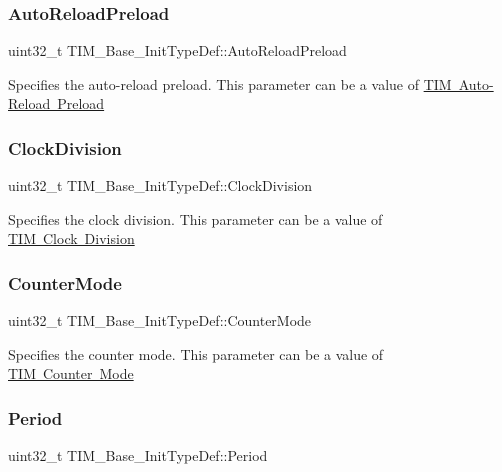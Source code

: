 \subsubsection{\texorpdfstring{AutoReloadPreload}{AutoReloadPreload}}
{\footnotesize\ttfamily uint32\+\_\+t T\+I\+M\+\_\+\+Base\+\_\+\+Init\+Type\+Def\+::\+Auto\+Reload\+Preload}

Specifies the auto-\/reload preload. This parameter can be a value of \mbox{\hyperlink{group___t_i_m___auto_reload_preload}{T\+IM Auto-\/\+Reload Preload}} \mbox{\label{struct_t_i_m___base___init_type_def_ade59c3a547a5409da845592f30596d17}} 
\subsubsection{\texorpdfstring{ClockDivision}{ClockDivision}}
{\footnotesize\ttfamily uint32\+\_\+t T\+I\+M\+\_\+\+Base\+\_\+\+Init\+Type\+Def\+::\+Clock\+Division}

Specifies the clock division. This parameter can be a value of \mbox{\hyperlink{group___t_i_m___clock_division}{T\+IM Clock Division}} \mbox{\label{struct_t_i_m___base___init_type_def_a16d0c02a8f35426360a64c0706656e35}} 
\subsubsection{\texorpdfstring{CounterMode}{CounterMode}}
{\footnotesize\ttfamily uint32\+\_\+t T\+I\+M\+\_\+\+Base\+\_\+\+Init\+Type\+Def\+::\+Counter\+Mode}

Specifies the counter mode. This parameter can be a value of \mbox{\hyperlink{group___t_i_m___counter___mode}{T\+IM Counter Mode}} \mbox{\label{struct_t_i_m___base___init_type_def_a8fab2bc184bb756763ff59c729b5be55}} 
\subsubsection{\texorpdfstring{Period}{Period}}
{\footnotesize\ttfamily uint32\+\_\+t T\+I\+M\+\_\+\+Base\+\_\+\+Init\+Type\+Def\+::\+Period}

